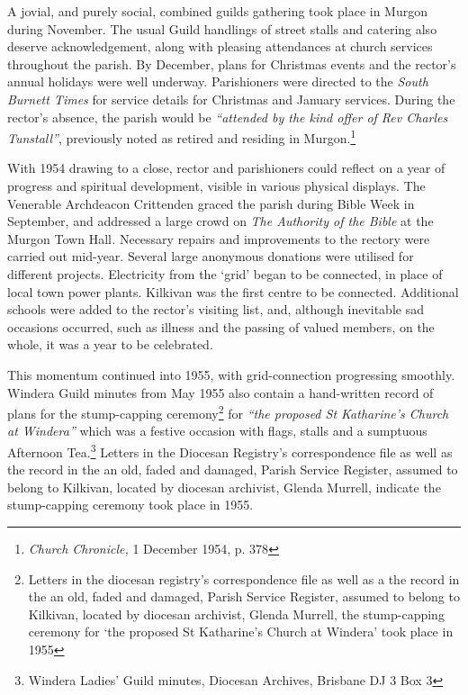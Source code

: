 A jovial, and purely social, combined guilds gathering took place in Murgon during November. The usual Guild handlings of street stalls and catering also deserve acknowledgement, along with pleasing attendances at church services throughout the parish. By December, plans for Christmas events and the rector's annual holidays were well underway. Parishioners were directed to the \emph{South Burnett Times} for service details for Christmas and January services. During the rector's absence, the parish would be \emph{``attended by the kind offer of Rev Charles Tunstall''}, previously noted as retired and residing in Murgon.\footnote{\emph{Church Chronicle,} 1 December 1954, p. 378}


With 1954 drawing to a close, rector and parishioners could reflect on a year of progress and spiritual development, visible in various physical displays. The Venerable Archdeacon Crittenden graced the parish during Bible Week in September, and addressed a large crowd on \emph{The Authority of the Bible} at the Murgon Town Hall\emph{.} Necessary repairs and improvements to the rectory were carried out mid-year. Several large anonymous donations were utilised for different projects. Electricity from the `grid' began to be connected, in place of local town power plants. Kilkivan was the first centre to be connected. Additional schools were added to the rector's visiting list, and, although inevitable sad occasions occurred, such as illness and the passing of valued members, on the whole, it was a year to be celebrated.



This momentum continued into 1955, with grid-connection progressing smoothly. Windera Guild minutes from May 1955 also contain a hand-written record of plans for the stump-capping ceremony\footnote{Letters in the diocesan registry's correspondence file as well as a the record in the an old, faded and damaged, Parish Service Register, assumed to belong to Kilkivan, located by diocesan archivist, Glenda Murrell, the stump-capping ceremony for `the proposed St Katharine's Church at Windera' took place in 1955} for \emph{``the proposed St Katharine's Church at Windera''} which was a festive occasion with flags, stalls and a sumptuous Afternoon Tea.\footnote{Windera Ladies' Guild minutes, Diocesan Archives, Brisbane DJ 3 Box 3} Letters in the Diocesan Registry's correspondence file as well as the record in the an old, faded and damaged, Parish Service Register, assumed to belong to Kilkivan, located by diocesan archivist, Glenda Murrell, indicate the stump-capping ceremony took place in 1955.








